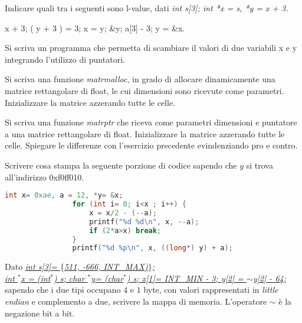 \documentclass[addpoints,11pt]{exam}
\begin{document}
\begin{questions}
		
		
		\question[1]
		Indicare quali tra i seguenti sono l-value, dati \emph{int s[3]; int *x = s, *y = x + 3.}
		
		\begin{oneparcheckboxes}
			\choice x + 3;
			\choice *( y + 3 ) = 3;
			\choice *x = y;
			\choice \&y;
			\choice a[3] - 3;
			\choice y = \&x.
		\end{oneparcheckboxes}
		
		
		
		\question [1]Si scriva un programma che permetta di scambiare il valori di due variabili x e y integrando l'utilizzo di puntatori.
		\makeemptybox{100pt}
		
		
		
		\question[2] Si scriva una funzione \emph{matrmalloc}, in grado di allocare dinamicamente una matrice rettangolare di float, le cui dimensioni sono ricevute come parametri. Inizializzare la matrice azzerando tutte le celle.
		\makeemptybox{100pt}
		
		
		
		\question[4] Si scriva una funzione \emph{matrptr} che riceva come parametri dimensioni e puntatore a una matrice rettangolare di float. Inizializzare la matrice azzerando tutte le celle. Spiegare le differenze con l'esercizio precedente evindenziando pro e contro.
		\makeemptybox{125pt}
		
		
		
		\question[4]
		Scrivere cosa stampa la seguente porzione di codice sapendo che $y$ si trova all'indirizzo 0xf0ff010.
		
		\begin{minipage}[t]{0.5\linewidth}
			\begin{lstlisting}[language=C]
				int x= 0xae, a = 12, *y= &x;
				for (int i= 0; i<x ; i++) {
					x = x/2 - (--a);
					printf("%d %d\n", x, --a);
					if (2*a>x) break;
				}
				printf("%d %p\n", x, ((long*) y) + a);
			\end{lstlisting}
		\end{minipage}
		\begin{minipage}[t]{0.5\linewidth}
			\makeemptybox{100pt}
		\end{minipage}
		
		
		
		\question[4]
		Dato \underline{\emph{int s[3]= $\{$511, -666, INT\_MAX)$\}$;}}\\
		\underline{\emph{int  $^*$x = (int$^*$) s;
				char $^*$y= (char$^*$) s;
				x[1]= INT\_MIN - 3; y[2] = $\sim$y[2] - 64;}}  
		sapendo che i due tipi occupano $4$ e $1$ byte, con valori rappresentati in \emph{little endian} e complemento a due, scrivere la mappa di memoria. L'operatore $\sim$ è la negazione bit a bit.
	\end{questions}
	
\end{document}
